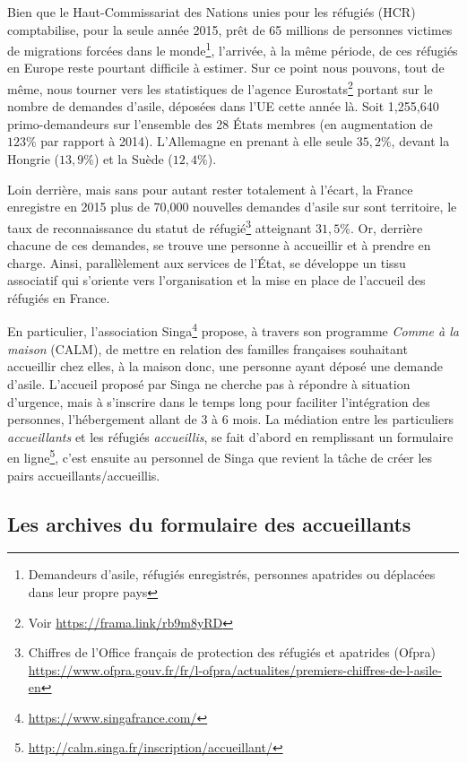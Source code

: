 \documentclass[symmetric,justified,marginals=raggedouter]{tufte-book}
\begin{document}
Bien que le Haut-Commissariat des Nations unies pour les réfugiés (HCR) comptabilise, pour la seule année 2015, prêt de 65 millions de personnes victimes de migrations forcées dans le monde\footnote{\RaggedOuter Demandeurs d'asile, réfugiés enregistrés, personnes apatrides ou déplacées dans leur propre pays}, l'arrivée, à la même période, de ces réfugiés en Europe reste pourtant difficile à estimer. Sur ce point nous pouvons, tout de même, nous tourner vers les statistiques de l'agence Eurostats\footnote{\RaggedOuter Voir \url{https://frama.link/rb9m8yRD}} portant sur le nombre de demandes d'asile, déposées dans l'UE cette année là. Soit 1,255,640 primo-demandeurs sur l'ensemble des 28 États membres (en augmentation de $123\%$ par rapport à 2014). L'Allemagne en prenant à elle seule $35,2\%$, devant la Hongrie ($13,9\%$) et la Suède ($12,4\%$).

Loin derrière, mais sans pour autant rester totalement à l'écart, la France enregistre en 2015 plus de 70,000 nouvelles demandes d'asile sur sont territoire, le taux de reconnaissance du statut de réfugié\footnote{\RaggedOuter Chiffres de l'Office français de protection des réfugiés et apatrides (Ofpra) \url{https://www.ofpra.gouv.fr/fr/l-ofpra/actualites/premiers-chiffres-de-l-asile-en}} atteignant $31,5\%$. Or, derrière chacune de ces demandes, se trouve une personne à accueillir et à prendre en charge. Ainsi, parallèlement aux services de l'État, se développe un tissu associatif qui s'oriente vers l'organisation et la mise en place de l'accueil des réfugiés en France. 

En particulier, l'association Singa\footnote{\RaggedOuter \url{https://www.singafrance.com/}} propose, à travers son programme \textit{Comme à la maison} (CALM), de mettre en relation des familles françaises souhaitant accueillir chez elles, à la maison donc, une personne ayant déposé une demande d'asile. L'accueil proposé par Singa ne cherche pas à répondre à situation d'urgence, mais à s'inscrire dans le temps long pour faciliter l'intégration des personnes, l'hébergement allant de 3 à 6 mois. La médiation entre les particuliers \textit{accueillants} et les réfugiés \textit{accueillis}, se fait d'abord en remplissant un formulaire en ligne\footnote{\RaggedOuter \url{http://calm.singa.fr/inscription/accueillant/}}, c'est ensuite au personnel de Singa que revient la tâche de créer les pairs accueillants/accueillis.

\subsection{Les archives du formulaire des accueillants}
\end{document}
